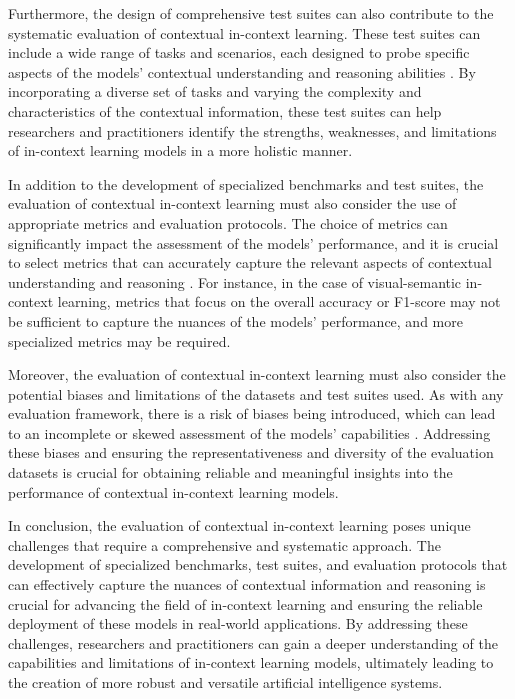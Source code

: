 \documentclass[11pt]{article}
\begin{document}
Furthermore, the design of comprehensive test suites can also contribute to the systematic evaluation of contextual in-context learning. These test suites can include a wide range of tasks and scenarios, each designed to probe specific aspects of the models' contextual understanding and reasoning abilities \cite{ref185,ref186}. By incorporating a diverse set of tasks and varying the complexity and characteristics of the contextual information, these test suites can help researchers and practitioners identify the strengths, weaknesses, and limitations of in-context learning models in a more holistic manner.

In addition to the development of specialized benchmarks and test suites, the evaluation of contextual in-context learning must also consider the use of appropriate metrics and evaluation protocols. The choice of metrics can significantly impact the assessment of the models' performance, and it is crucial to select metrics that can accurately capture the relevant aspects of contextual understanding and reasoning \cite{ref187,ref188}. For instance, in the case of visual-semantic in-context learning, metrics that focus on the overall accuracy or F1-score may not be sufficient to capture the nuances of the models' performance, and more specialized metrics may be required.

Moreover, the evaluation of contextual in-context learning must also consider the potential biases and limitations of the datasets and test suites used. As with any evaluation framework, there is a risk of biases being introduced, which can lead to an incomplete or skewed assessment of the models' capabilities \cite{ref189,ref190}. Addressing these biases and ensuring the representativeness and diversity of the evaluation datasets is crucial for obtaining reliable and meaningful insights into the performance of contextual in-context learning models.

In conclusion, the evaluation of contextual in-context learning poses unique challenges that require a comprehensive and systematic approach. The development of specialized benchmarks, test suites, and evaluation protocols that can effectively capture the nuances of contextual information and reasoning is crucial for advancing the field of in-context learning and ensuring the reliable deployment of these models in real-world applications. By addressing these challenges, researchers and practitioners can gain a deeper understanding of the capabilities and limitations of in-context learning models, ultimately leading to the creation of more robust and versatile artificial intelligence systems.
\end{document}
